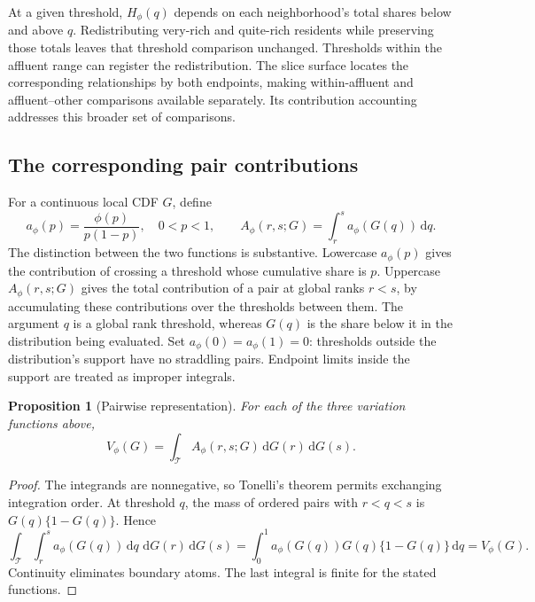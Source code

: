 \documentclass[11pt]{article}
\newtheorem{proposition}{Proposition}
\newcommand{\dd}{\,\mathrm{d}}
\newcommand{\T}{\mathcal{T}}
\begin{document}
At a given threshold, $H_\phi(q)$ depends on each neighborhood's total shares below and above $q$. Redistributing very-rich and quite-rich residents while preserving those totals leaves that threshold comparison unchanged. Thresholds within the affluent range can register the redistribution. The slice surface locates the corresponding relationships by both endpoints, making within-affluent and affluent--other comparisons available separately. Its contribution accounting addresses this broader set of comparisons.

\subsection{The corresponding pair contributions}

For a continuous local CDF $G$, define
\begin{equation}
a_\phi(p)=\frac{\phi(p)}{p(1-p)},\quad 0<p<1,
\qquad
A_\phi(r,s;G)=\int_r^s a_\phi(G(q))\dd q.
\label{eq:pairscore}
\end{equation}
The distinction between the two functions is substantive. Lowercase $a_\phi(p)$ gives the contribution of crossing a threshold whose cumulative share is $p$. Uppercase $A_\phi(r,s;G)$ gives the total contribution of a pair at global ranks $r<s$, by accumulating these contributions over the thresholds between them. The argument $q$ is a global rank threshold, whereas $G(q)$ is the share below it in the distribution being evaluated. Set $a_\phi(0)=a_\phi(1)=0$: thresholds outside the distribution's support have no straddling pairs. Endpoint limits inside the support are treated as improper integrals.

\begin{proposition}[Pairwise representation]
For each of the three variation functions above,
\begin{equation}
V_\phi(G)
=
\int_{\T}A_\phi(r,s;G)\dd G(r)\dd G(s).
\label{eq:identity}
\end{equation}
\end{proposition}
\begin{proof}
The integrands are nonnegative, so Tonelli's theorem permits exchanging integration order. At threshold $q$, the mass of ordered pairs with $r<q<s$ is $G(q)\{1-G(q)\}$. Hence
\[
\int_{\T}\int_r^s a_\phi(G(q))\dd q\,\dd G(r)\dd G(s)
=
\int_0^1a_\phi(G(q))G(q)\{1-G(q)\}\dd q
=
V_\phi(G).
\]
Continuity eliminates boundary atoms. The last integral is finite for the stated functions.
\end{proof}
\end{document}
